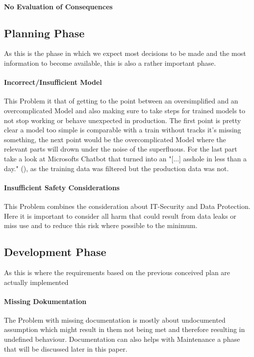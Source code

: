 \paragraph{No Evaluation of Consequences}

\subsection{Planning Phase}
As this is the phase in which we expect most decisions to be made and 
the most information to become available, this is also a rather important phase.

\paragraph{Incorrect/Insufficient Model}
This Problem it that of getting to the point between an oversimplified and an overcomplicated Model and also making sure 
to take steps for trained models to not stop working or behave unexpected in production.
The first point is pretty clear a model too simple is comparable with a train without tracks it's missing something, the next point would be the overcomplicated Model where the relevant parts will drown under the noise of the superfluous. For the last part take a look at Microsofts Chatbot that turned into an  "[...] asshole in less than a day." (\cite{James2018}), as the training data was filtered but the production data was not.

\paragraph{Insufficient Safety Considerations}
This Problem combines the consideration about IT-Security and Data Protection. Here it is important to consider all harm that could result from data leaks or miss use and to reduce this risk where possible to the minimum.


\subsection{Development Phase}
As this is where the requirements based on the previous conceived plan are actually implemented

\paragraph{Missing Dokumentation}
The Problem with missing documentation is mostly about undocumented assumption which might result in them not being met
and therefore resulting in undefined behaviour.
Documentation can also helps with Maintenance a phase that will be discussed later in this paper.

